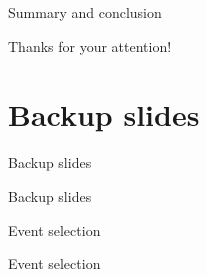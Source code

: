 \documentclass{beamer}
\begin{document}
\begin{frame}{Summary and conclusion}
  \begin{center}
    {\huge Thanks for your attention!}
  \end{center}
\end{frame}

\section{Backup slides}
\begin{frame}{Backup slides}
  \begin{center}
    {\huge Backup slides}
  \end{center}
\end{frame}

\begin{frame}{Event selection}
  \begin{center}
    {\huge Event selection}
  \end{center}
\end{frame}
\end{document}
